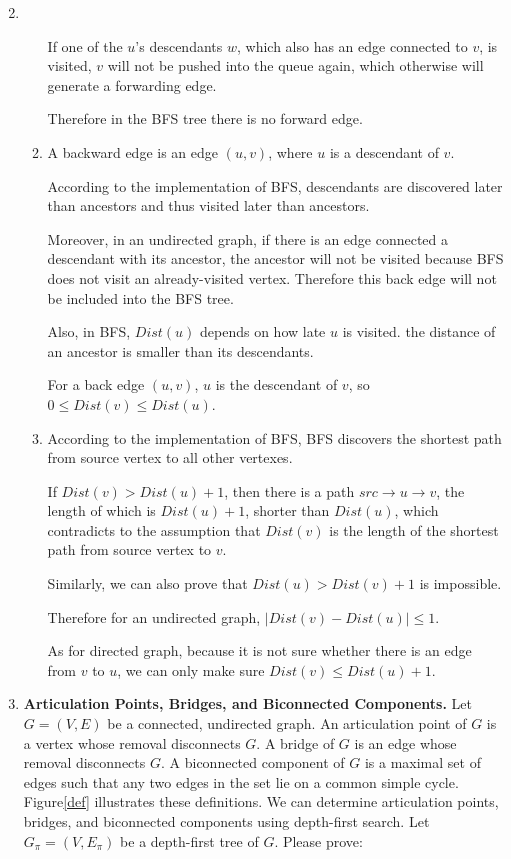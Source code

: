 \documentclass[12pt,a4paper]{article}
\makeatletter
\newtheorem*{solution}{Solution}
\theoremstyle{definition}
\renewenvironment{solution}[1][Solution] {\par\pushQED{\qed}\normalfont\topsep6\p@\@plus6\p@\relax\trivlist\item[\hskip\labelsep\bfseries#1\@addpunct{.}]\ignorespaces}{\popQED\endtrivlist\@endpefalse} \makeatother
\makeatother
\begin{document}
\begin{enumerate}
\begin{solution}
\begin{enumerate}
		    If one of the $u$'s descendants $w$, which also has an edge connected to $v$, is visited, $v$ will not be pushed into the queue again, which otherwise will generate a forwarding edge.
		    
		    Therefore in the BFS tree there is no forward edge.
		\item  
		    A backward edge is an edge $(u,v)$, where $u$ is a descendant of $v$.
		    
		    According to the implementation of BFS, descendants are discovered later than ancestors and thus visited later than ancestors.
		    
		    Moreover, in an undirected graph, if there is an edge connected a descendant with its ancestor, the ancestor will not be visited because BFS does not visit an already-visited vertex. Therefore this back edge will not be included into the BFS tree.
		    
		    Also, in BFS, $Dist(u)$ depends on how late $u$ is visited. the distance of an ancestor is smaller than its descendants.
		    
		    For a back edge $(u,v)$, $u$ is the descendant of $v$, so $0 \leq Dist(v) \leq Dist(u)$.
		\item 
		    According to the implementation of BFS, BFS discovers the shortest path from source vertex to all other vertexes.
		    
		    If $Dist(v)>Dist(u)+1$, then there is a path $src \rightarrow u \rightarrow v$, the length of which is $Dist(u)+1$, shorter than $Dist(u)$, which contradicts to the assumption that $Dist(v)$ is the length of the shortest path from source vertex to $v$.
		    
		    Similarly, we can also prove that $Dist(u)>Dist(v)+1$ is impossible.
		    
		    Therefore for an undirected graph, $|Dist(v)-Dist(u)|\le 1$.
		    
		    As for directed graph, because it is not sure whether there is an edge from $v$ to $u$, we can only make sure $Dist(v)\leq Dist(u)+1$.
	\end{enumerate}
\end{solution}

    \item 
    \textbf{Articulation Points, Bridges, and Biconnected Components.} Let $G=(V, E)$ be a connected, undirected graph. An articulation point of $G$ is a vertex whose removal disconnects $G$. A bridge of $G$ is an edge whose removal disconnects $G .$ A biconnected component of $G$ is a maximal set of edges such that any two edges in the set lie on a common simple cycle. Figure\ref{def} illustrates these definitions. We can determine articulation points, bridges, and biconnected components using depth-first search. Let $G_{\pi}=\left(V, E_{\pi}\right)$ be a depth-first tree of $G$. Please prove:
    

\end{enumerate}
\end{document}
